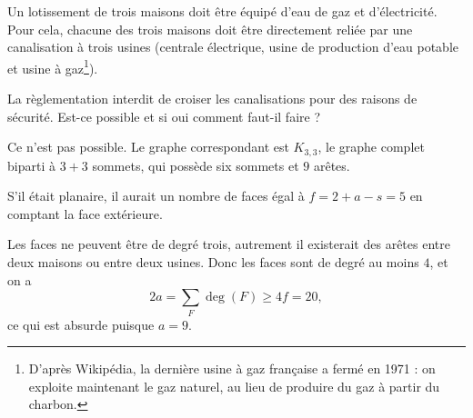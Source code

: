 \begin{exo}
Un lotissement de trois maisons doit être équipé d'eau de gaz et d'électricité. Pour cela, chacune des trois maisons doit être directement reliée par une canalisation à trois usines (centrale électrique, usine de production d'eau potable et usine à gaz\footnote{D'après Wikipédia, la dernière usine à gaz française a fermé en 1971 : on exploite maintenant le gaz naturel, au lieu de produire du gaz à partir du charbon.}). 

La règlementation interdit de croiser les canalisations pour des raisons de sécurité. Est-ce possible et si oui comment faut-il faire ?
\begin{sol}Ce n'est pas possible. Le graphe correspondant est $K_{3,3}$, le graphe complet biparti à  $3+3$ sommets, qui possède six sommets et $9$ arêtes.

\begin{center}
\end{center}

S'il était planaire, il aurait un nombre de faces égal à $f=2+a-s = 5$ en comptant la face extérieure. 

Les faces ne peuvent être de degré trois, autrement il existerait des arêtes entre deux maisons ou entre deux usines. Donc les faces sont de degré au moins $4$, et on a 
\[ 2a  = \sum_F \operatorname{deg}(F) \geq 4f = 20,\]
ce qui est absurde puisque $a=9$. 
\end{sol}
\end{exo}

